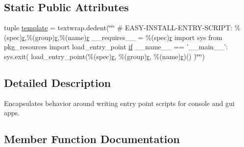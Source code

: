 \subsection*{Static Public Attributes}
\begin{DoxyCompactItemize}
\item 
tuple \hyperlink{classsetuptools_1_1command_1_1easy__install_1_1ScriptWriter_ae7705cf44f333fc94cbb325302ad165f}{template} = textwrap.\+dedent(\char`\"{}\char`\"{}\char`\"{} \# E\+A\+S\+Y-\/I\+N\+S\+T\+A\+L\+L-\/E\+N\+T\+R\+Y-\/S\+C\+R\+I\+P\+T\+: \%(spec)\hyperlink{indexexpr_8h_ac434fd11cc2493608d8d91424d60c17e}{r},\%(group)\hyperlink{indexexpr_8h_ac434fd11cc2493608d8d91424d60c17e}{r},\%(name)\hyperlink{indexexpr_8h_ac434fd11cc2493608d8d91424d60c17e}{r} \+\_\+\+\_\+requires\+\_\+\+\_\+ = \%(spec)\hyperlink{indexexpr_8h_ac434fd11cc2493608d8d91424d60c17e}{r} import sys from pkg\+\_\+resources import load\+\_\+entry\+\_\+point \hyperlink{minmax_8h_a30a0ee9fee303f01d9c5e6f669e0dfe9}{if} \+\_\+\+\_\+name\+\_\+\+\_\+ == '\+\_\+\+\_\+main\+\_\+\+\_\+'\+: sys.\+exit( load\+\_\+entry\+\_\+point(\%(spec)\hyperlink{indexexpr_8h_ac434fd11cc2493608d8d91424d60c17e}{r}, \%(group)\hyperlink{indexexpr_8h_ac434fd11cc2493608d8d91424d60c17e}{r}, \%(name)\hyperlink{indexexpr_8h_ac434fd11cc2493608d8d91424d60c17e}{r})() )\char`\"{}\char`\"{}\char`\"{})
\end{DoxyCompactItemize}


\subsection{Detailed Description}
\begin{DoxyVerb}Encapsulates behavior around writing entry point scripts for console and
gui apps.
\end{DoxyVerb}
 

\subsection{Member Function Documentation}
\hypertarget{classsetuptools_1_1command_1_1easy__install_1_1ScriptWriter_a0340e444a3a20a908bdf68780609e4b2}{}

